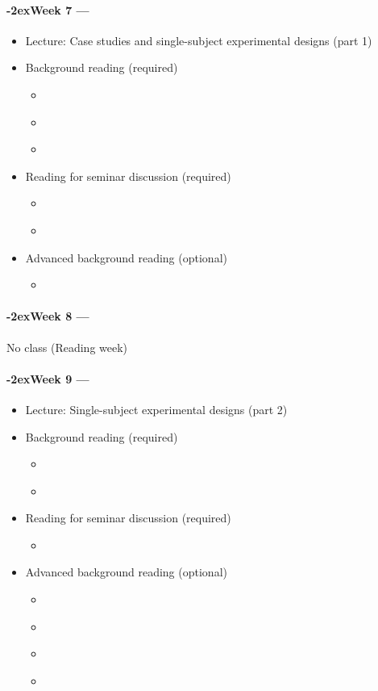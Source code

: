 \documentclass[a4paper, 11pt]{article}
\newcommand{\week}[1]{%
  \paragraph*{\kern-2ex\quad #1 --- \syldate{\today}}%


  \ifdim\wd1=\wd\MONDAY
    \AdvanceDate[7]
  \else
    \AdvanceDate[7]
  \fi
}
\begin{document}
\week{Week 7} 
\begin{itemize}
\item Lecture: Case studies and single-subject experimental designs (part 1)
\item Background reading (required)
	\begin{itemize}
	\item \citet{Vance2012}
	\item \citet{Horner2005}
	\item \citet{Byiers2012}
	\end{itemize}
\item Reading for seminar discussion (required)
	\begin{itemize}
	\item \citet{Harris2000}
	\item \citet{Hewat2018}
	\end{itemize}
\item Advanced background reading (optional)
	\begin{itemize}
	\item \citet{Parker2005}
	\end{itemize}
\end{itemize}

\week{Week 8} No class (Reading week)

\week{Week 9} 
\begin{itemize}
\item Lecture:  Single-subject experimental designs (part 2)
\item Background reading (required)
	\begin{itemize}
	\item \citet{Tate2008}
	\item \citet{Logan2008}
	\end{itemize}
\item Reading for seminar discussion (required)
	\begin{itemize}
	\item \citet{Rudolph2014}
	\end{itemize}
\item Advanced background reading (optional)
	\begin{itemize}
	\item \citet{Wilson2011}
	\item \citet{Schlosser2008a}
	\item \citet{Auerbach2014}
	\item \citet{Gierut2015}
	\end{itemize}
\end{itemize}
\end{document}

